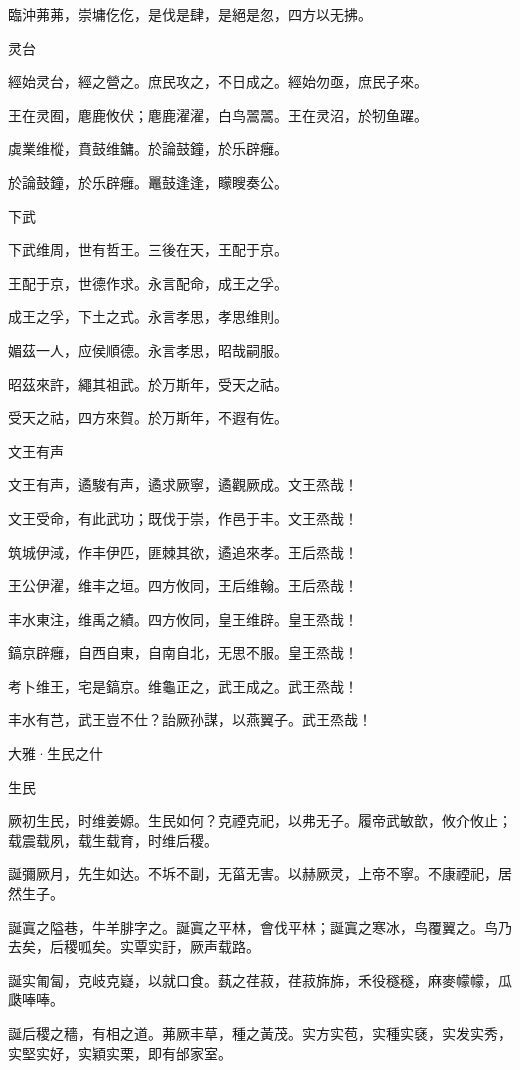 臨沖茀茀，崇墉仡仡，是伐是肆，是絕是忽，四方以无拂。

灵台

經始灵台，經之營之。庶民攻之，不日成之。經始勿亟，庶民子來。

王在灵囿，麀鹿攸伏；麀鹿濯濯，白鸟翯翯。王在灵沼，於牣鱼躍。

虡業维樅，賁鼓维鏞。於論鼓鐘，於乐辟癰。

於論鼓鐘，於乐辟癰。鼉鼓逢逢，矇瞍奏公。

下武

下武维周，世有哲王。三後在天，王配于京。

王配于京，世德作求。永言配命，成王之孚。

成王之孚，下土之式。永言孝思，孝思维則。

媚茲一人，应侯順德。永言孝思，昭哉嗣服。

昭茲來許，繩其祖武。於万斯年，受天之祜。

受天之祜，四方來賀。於万斯年，不遐有佐。

文王有声

文王有声，遹駿有声，遹求厥寧，遹觀厥成。文王烝哉！

文王受命，有此武功；既伐于崇，作邑于丰。文王烝哉！

筑城伊淢，作丰伊匹，匪棘其欲，遹追來孝。王后烝哉！

王公伊濯，维丰之垣。四方攸同，王后维翰。王后烝哉！

丰水東注，维禹之績。四方攸同，皇王维辟。皇王烝哉！

鎬京辟癰，自西自東，自南自北，无思不服。皇王烝哉！

考卜维王，宅是鎬京。维龜正之，武王成之。武王烝哉！

丰水有芑，武王豈不仕？詒厥孙謀，以燕翼子。武王烝哉！




大雅·生民之什


生民

厥初生民，时维姜嫄。生民如何？克禋克祀，以弗无子。履帝武敏歆，攸介攸止；载震载夙，载生载育，时维后稷。

誕彌厥月，先生如达。不坼不副，无菑无害。以赫厥灵，上帝不寧。不康禋祀，居然生子。

誕寘之隘巷，牛羊腓字之。誕寘之平林，會伐平林；誕寘之寒冰，鸟覆翼之。鸟乃去矣，后稷呱矣。实覃实訏，厥声载路。

誕实匍匐，克岐克嶷，以就口食。蓺之荏菽，荏菽旆旆，禾役穟穟，麻麥幪幪，瓜瓞唪唪。

誕后稷之穡，有相之道。茀厥丰草，種之黃茂。实方实苞，实種实褎，实发实秀，实堅实好，实穎实栗，即有邰家室。

